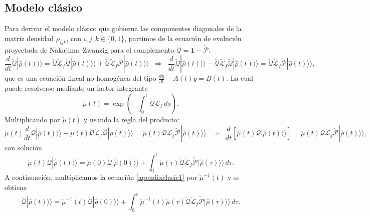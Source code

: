 \begin{appendixs}
\subsection{Modelo clásico}
Para derivar el modelo clásico que gobierna las componentes diagonales de la matriz densidad
$\rho_{ijk}$, con $i,j,k\in\{0,1\}$, partimos de la ecuación de evolución proyectada de
Nakajima–Zwanzig para el complemento $\check{\mathcal{Q}}=\mathbf{1}-\check{\mathcal{P}}$:
\begin{equation*}
    \frac{d}{dt}\check{\mathcal{Q}}|\hat{\rho}(t)\rangle\rangle
    = \check{\mathcal{Q}}\check{\mathcal{L}}_{f}\check{\mathcal{Q}}|\hat{\rho}(t)\rangle\rangle
      + \check{\mathcal{Q}}\check{\mathcal{L}}_{f}\check{\mathcal{P}}|\hat{\rho}(t)\rangle\rangle
    \;\;\Longrightarrow\;\;
    \frac{d}{dt}\check{\mathcal{Q}}|\hat{\rho}(t)\rangle\rangle
      - \check{\mathcal{Q}}\check{\mathcal{L}}_{f}\check{\mathcal{Q}}|\hat{\rho}(t)\rangle\rangle
    = \check{\mathcal{Q}}\check{\mathcal{L}}_{f}\check{\mathcal{P}}|\hat{\rho}(t)\rangle\rangle,
\end{equation*}
que es una ecuación lineal no homogénea del tipo
\(
\frac{dy}{dt}-A(t)y=B(t)
\).
La cual puede resolverse mediante un factor integrante
\begin{equation*}
    \check{\mu}(t)=\exp\!\left(-\int_{0}^{t}\check{\mathcal{Q}}\check{\mathcal{L}}_{f}\,ds\right).
\end{equation*}
Multiplicando por $\check{\mu}(t)$ y usando la regla del producto:
\begin{equation*}
    \check{\mu}(t)\frac{d}{dt}\check{\mathcal{Q}}|\hat{\rho}(t)\rangle\rangle
    -\check{\mu}(t)\check{\mathcal{Q}}\check{\mathcal{L}}_{f}\check{\mathcal{Q}}|\hat{\rho}(t)\rangle\rangle
    =\check{\mu}(t)\check{\mathcal{Q}}\check{\mathcal{L}}_{f}\check{\mathcal{P}}|\hat{\rho}(t)\rangle\rangle
    \;\;\Longrightarrow\;\;
    \frac{d}{dt}\!\left[\check{\mu}(t)\check{\mathcal{Q}}|\hat{\rho}(t)\rangle\rangle\right]
    =\check{\mu}(t)\check{\mathcal{Q}}\check{\mathcal{L}}_{f}\check{\mathcal{P}}|\hat{\rho}(t)\rangle\rangle,
\end{equation*}
con solución
\begin{equation}
    \check{\mu}(t)\check{\mathcal{Q}}|\hat{\rho}(t)\rangle\rangle
    =\check{\mu}(0)\check{\mathcal{Q}}|\hat{\rho}(0)\rangle\rangle
     +\int_{0}^{t}\check{\mu}(\tau)\check{\mathcal{Q}}\check{\mathcal{L}}_{f}\check{\mathcal{P}}
        |\hat{\rho}(\tau)\rangle\rangle\,d\tau .
    \label{apendixclasic1}
\end{equation}
A continuación, multiplicamos la ecuación \eqref{apendixclasic1} por $\check{\mu}^{-1}(t)$ y se obtiene
\begin{equation}
    \check{\mathcal{Q}}|\hat{\rho}(t)\rangle\rangle
    =\check{\mu}^{-1}(t)\check{\mathcal{Q}}|\hat{\rho}(0)\rangle\rangle
     +\int_{0}^{t}\check{\mu}^{-1}(t)\check{\mu}(\tau)\check{\mathcal{Q}}\check{\mathcal{L}}_{f}\check{\mathcal{P}}
     |\hat{\rho}(\tau)\rangle\rangle\,d\tau .
    \label{apendixclasic2}
\end{equation}



\end{appendixs}

